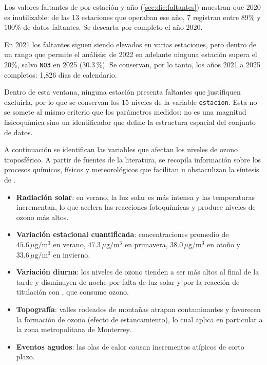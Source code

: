 Los valores faltantes de  por estación y año (\cref{sec:dic:faltantes}) muestran que 2020 es inutilizable: de las 13 estaciones que operaban ese año, 7 registran entre $89\%$ y $100\%$ de datos faltantes. Se descarta por completo el año 2020.

En 2021 los faltantes siguen siendo elevados en varias estaciones, pero dentro de un rango que permite el análisis; de 2022 en adelante ninguna estación supera el $20\%$, salvo \texttt{NO3} en 2025 (30.3\,\%). Se conservan, por lo tanto, los años 2021 a 2025 completos: 1,826 días de calendario.

Dentro de esta ventana, ninguna estación presenta faltantes que justifiquen excluirla, por lo que se conservan los 15 niveles de la variable \texttt{estacion}. Esta no se somete al mismo criterio que los parámetros medidos: no es una magnitud fisicoquímica sino un identificador
que define la estructura espacial del conjunto de datos.

A continuación se identifican las variables que afectan los niveles de ozono troposférico. A partir de fuentes de la literatura, se recopila información sobre los procesos químicos, físicos y meteorológicos que facilitan u obstaculizan la síntesis de .

\begin{itemize}
    \item \textbf{Radiación solar}: en verano, la luz solar es más intensa y las temperaturas incrementan, lo que acelera las reacciones fotoquímicas y produce niveles de ozono más altos.
    \item \textbf{Variación estacional cuantificada}: concentraciones promedio de $45.6\,\mu\mathrm{g}/\mathrm{m}^{3}$ en verano, $47.3\,\mu\mathrm{g}/\mathrm{m}^{3}$ en primavera, $38.0\,\mu\mathrm{g}/\mathrm{m}^{3}$ en otoño y $33.6\,\mu\mathrm{g}/\mathrm{m}^{3}$ en invierno.
    \item \textbf{Variación diurna}: los niveles de ozono tienden a ser más altos al final de la tarde y disminuyen de noche por falta de luz solar y por la reacción de titulación con , que consume ozono.
    \item \textbf{Topografía}: valles rodeados de montañas atrapan contaminantes y favorecen la formación de ozono (efecto de estancamiento), lo cual aplica en particular a la zona metropolitana de Monterrey.
    \item \textbf{Eventos agudos}: las olas de calor causan incrementos atípicos de corto plazo.
\end{itemize}


